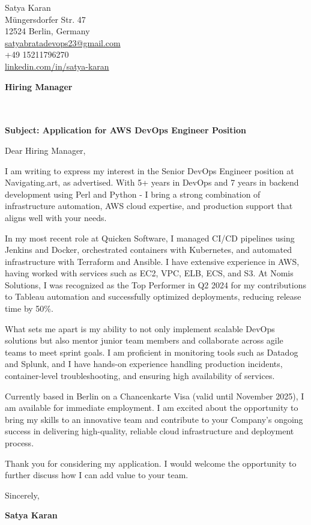 \documentclass[11pt]{article}
\begin{document}
\begin{flushright}
Satya Karan \\
Müngersdorfer Str. 47 \\
12524 Berlin, Germany \\
\href{mailto:satyabratadevops23@gmail.com}{satyabratadevops23@gmail.com} \\
+49 15211796270 \\
\href{https://www.linkedin.com/in/satya-karan}{linkedin.com/in/satya-karan}
\end{flushright}

\vspace{1em}

\textbf{Hiring Manager} \\
[Navigating.art] \\
[Berlin] \\

\vspace{1em}

\textbf{Subject: Application for AWS DevOps Engineer Position}

Dear Hiring Manager,

I am writing to express my interest in the Senior DevOps Engineer position at Navigating.art, as advertised. With 5+ years in DevOps and 7 years in backend development using Perl and Python - I bring a strong combination of infrastructure automation, AWS cloud expertise, and production support that aligns well with your needs.

In my most recent role at Quicken Software, I managed CI/CD pipelines using Jenkins and Docker, orchestrated containers with Kubernetes, and automated infrastructure with Terraform and Ansible. I have extensive experience in AWS, having worked with services such as EC2, VPC, ELB, ECS, and S3. At Nomis Solutions, I was recognized as the Top Performer in Q2 2024 for my contributions to Tableau automation and successfully optimized deployments, reducing release time by 50\%.

What sets me apart is my ability to not only implement scalable DevOps solutions but also mentor junior team members and collaborate across agile teams to meet sprint goals. I am proficient in monitoring tools such as Datadog and Splunk, and I have hands-on experience handling production incidents, container-level troubleshooting, and ensuring high availability of services.

Currently based in Berlin on a Chancenkarte Visa (valid until November 2025), I am available for immediate employment. I am excited about the opportunity to bring my skills to an innovative team and contribute to your Company's ongoing success in delivering high-quality, reliable cloud infrastructure and deployment process.

Thank you for considering my application. I would welcome the opportunity to further discuss how I can add value to your team.


Sincerely, 

\textbf{Satya Karan}
\end{document}
